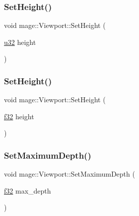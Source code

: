 \hypertarget{structmage_1_1_viewport_acee05bd3d8ee5707a677f418a9333368}{}\label{structmage_1_1_viewport_acee05bd3d8ee5707a677f418a9333368} 
\subsubsection{\texorpdfstring{Set\+Height()}{SetHeight()}\hspace{0.1cm}{\footnotesize\ttfamily [1/2]}}
{\footnotesize\ttfamily void mage\+::\+Viewport\+::\+Set\+Height (\begin{DoxyParamCaption}\item[{\hyperlink{namespacemage_af2b398bf98eb10351f49cad73fe2cc73}{u32}}]{height }\end{DoxyParamCaption})\hspace{0.3cm}{\ttfamily [noexcept]}}

\hypertarget{structmage_1_1_viewport_a3714f19949068add0770de77751bb167}{}\label{structmage_1_1_viewport_a3714f19949068add0770de77751bb167} 
\subsubsection{\texorpdfstring{Set\+Height()}{SetHeight()}\hspace{0.1cm}{\footnotesize\ttfamily [2/2]}}
{\footnotesize\ttfamily void mage\+::\+Viewport\+::\+Set\+Height (\begin{DoxyParamCaption}\item[{\hyperlink{namespacemage_a6a44ad388483959dc4dff9f2aef91431}{f32}}]{height }\end{DoxyParamCaption})\hspace{0.3cm}{\ttfamily [noexcept]}}

\hypertarget{structmage_1_1_viewport_a5c81f436b1cdc411014c6f0a3d9e60d2}{}\label{structmage_1_1_viewport_a5c81f436b1cdc411014c6f0a3d9e60d2} 
\subsubsection{\texorpdfstring{Set\+Maximum\+Depth()}{SetMaximumDepth()}}
{\footnotesize\ttfamily void mage\+::\+Viewport\+::\+Set\+Maximum\+Depth (\begin{DoxyParamCaption}\item[{\hyperlink{namespacemage_a6a44ad388483959dc4dff9f2aef91431}{f32}}]{max\+\_\+depth }\end{DoxyParamCaption})\hspace{0.3cm}{\ttfamily [noexcept]}}

